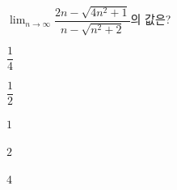 $\displaystyle\lim_{n\to\infty}\dfrac{2n-\sqrt{4n^2+1}}{n-\sqrt{n^2+2}}$의 값은?
\begin{choices32}{\rule[-3ex]{0pt}{8ex}$\dfrac{1}{4}$}{\rule[-3ex]{0pt}{8ex}$\dfrac{1}{2}$}{\rule[-3ex]{0pt}{8ex}$1$}{\rule[-3ex]{0pt}{8ex}$2$}{\rule[-3ex]{0pt}{8ex}$4$}\end{choices32}
